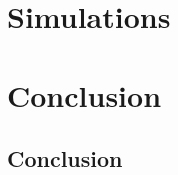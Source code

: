 \documentclass[a4paper,11pt,twoside,openright]{report}
\renewcommand{\(}{\ensuremath{\left(}}
\renewcommand{\)}{\ensuremath{\right)}}
\begin{document}
	\part{Simulations}
		

	\part*{Conclusion}
		\chapter{Conclusion}





\end{document}
